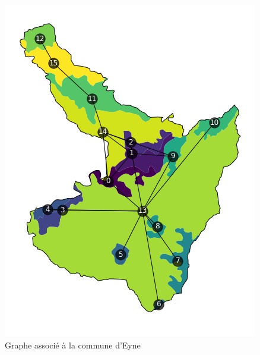 \begin{figure}
    \centering
    \includegraphics[scale=0.5]{figures/eyne-map-graph}
    \caption{Graphe associé à la commune d'Eyne}
\end{figure}







